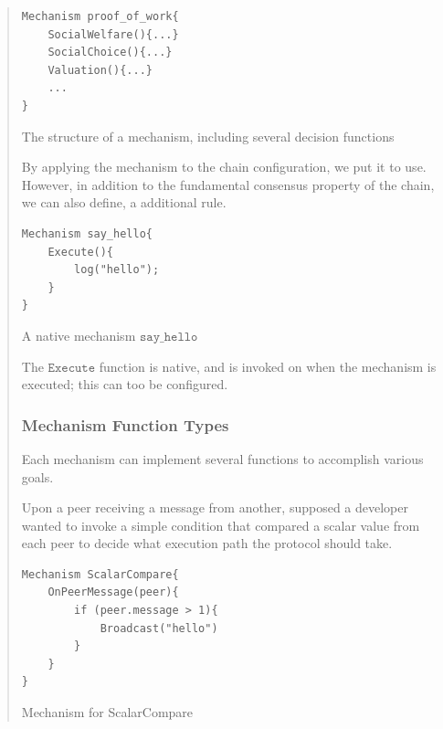 \documentclass[12pt, titlepage, twocolumn]{report}
\begin{document}
\begin{quotation}
\begin{listing}[ht]
\begin{minipage}{\linewidth}
\begin{lstlisting}
Mechanism proof_of_work{
	SocialWelfare(){...}
	SocialChoice(){...}
	Valuation(){...}
	...	
}
\end{lstlisting}
\end{minipage}
\caption{The structure of a mechanism, including several decision functions}
\label{code:5}
\end{listing}

By applying the mechanism to the chain configuration, we put it to use. However, in addition to the fundamental consensus property of the chain, we can also define, a additional rule.

\begin{listing}[ht]
\begin{minipage}{\linewidth}
\begin{lstlisting}
Mechanism say_hello{
	Execute(){
		log("hello");
	}
}
\end{lstlisting}
\end{minipage}
\caption{A native mechanism \(\texttt{say_hello}\)}
\label{code:6}
\end{listing}

The \(\texttt{Execute}\) function is native, and is invoked on when the mechanism is executed; this can too be configured.

\subsubsection{Mechanism Function Types}
Each mechanism can implement several functions to accomplish various goals. 

Upon a peer receiving a message from another, supposed a developer wanted to invoke a simple condition that compared a scalar value from each peer to decide what execution path the protocol should take.

\begin{listing}[ht]
\begin{minipage}{\linewidth}
\begin{lstlisting}
Mechanism ScalarCompare{
	OnPeerMessage(peer){
		if (peer.message > 1){
			Broadcast("hello")
		}
	}
}
\end{lstlisting}
\end{minipage}
\caption{Mechanism for ScalarCompare}
\label{code:6}
\end{listing}


\end{quotation}
\end{document}
